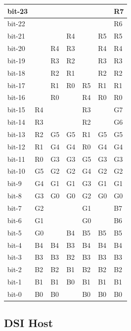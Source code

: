 \documentclass[main\_\_EN.tex]{subfiles}
\begin{document}
\begin{longtable}[c]{ |p{2.5cm}|p{1cm}|p{1cm}|p{1cm}|p{1cm}|p{1cm}|p{1cm}| }
        bit-23 &    &    &    &    &    & R7 \\\hline
        bit-22 &    &    &    &    &    & R6 \\\hline
        bit-21 &    &    & R4 &    & R5 & R5 \\\hline
        bit-20 &    & R4 & R3 &    & R4 & R4 \\\hline
        bit-19 &    & R3 & R2 &    & R3 & R3 \\\hline
        bit-18 &    & R2 & R1 &    & R2 & R2 \\\hline
        bit-17 &    & R1 & R0 & R5 & R1 & R1 \\\hline
        bit-16 &    & R0 &    & R4 & R0 & R0 \\\hline
        bit-15 & R4 &    &    & R3 &    & G7 \\\hline
        bit-14 & R3 &    &    & R2 &    & G6 \\\hline
        bit-13 & R2 & G5 & G5 & R1 & G5 & G5 \\\hline
        bit-12 & R1 & G4 & G4 & R0 & G4 & G4 \\\hline
        bit-11 & R0 & G3 & G3 & G5 & G3 & G3 \\\hline
        bit-10 & G5 & G2 & G2 & G4 & G2 & G2 \\\hline
        bit-9  & G4 & G1 & G1 & G3 & G1 & G1 \\\hline
        bit-8  & G3 & G0 & G0 & G2 & G0 & G0 \\\hline
        bit-7  & G2 &    &    & G1 &    & B7 \\\hline
        bit-6  & G1 &    &    & G0 &    & B6 \\\hline
        bit-5  & G0 &    & B4 & B5 & B5 & B5 \\\hline
        bit-4  & B4 & B4 & B3 & B4 & B4 & B4 \\\hline
        bit-3  & B3 & B3 & B2 & B3 & B3 & B3 \\\hline
        bit-2  & B2 & B2 & B1 & B2 & B2 & B2 \\\hline
        bit-1  & B1 & B1 & B0 & B1 & B1 & B1 \\\hline
        bit-0  & B0 & B0 &    & B0 & B0 & B0 \\\hline
        

\end{longtable}
\normalsize

\subsection{DSI Host}
\end{document}
